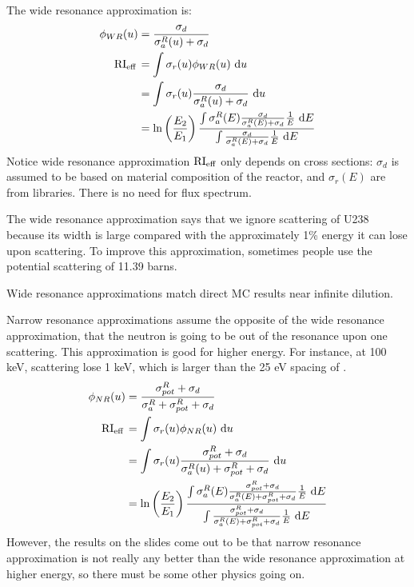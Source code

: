 \documentclass{school-22.211-notes}
\date{February 27, 2012}
\begin{document}
\maketitle

\clearpage
{}
The wide resonance approximation is: 
\begin{align}
\phi_{WR} (u) &= \frac{\sigma_d}{\sigma_{a}^R (u) +  \sigma_d } \\
\left. \mathrm{RI}_{\mathrm{eff}} \right. &= \int \sigma_r (u) \phi_{WR} (u) \mbox{ }\mathrm{d} u \\
&= \int \sigma_r(u) \frac{\sigma_d}{\sigma_a^R(u) + \sigma_d} \mbox{ }\mathrm{d} u \\
&= \ln\left( \frac{E_2}{E_1} \right) \frac{ \int \sigma_{a}^R(E) \frac{\sigma_d}{\sigma_{a}^R(E) + \sigma_d} \frac{1}{E} \mbox{ }\mathrm{d} E}{ \int \frac{\sigma_d}{\sigma_{a}^R(E) + \sigma_d} \frac{1}{E} \mbox{ }\mathrm{d} E}
\end{align}
Notice wide resonance approximation $\mathrm{RI}_{\mathrm{eff}}$ only depends on cross sections: $\sigma_d$ is assumed to be based on material composition of the reactor, and $\sigma_r(E)$ are from libraries. There is no need for flux spectrum. 

The wide resonance approximation says that we ignore scattering of U238 because its width is large compared with the approximately 1\% energy it can lose upon scattering. To improve this approximation, sometimes people use the potential scattering of 11.39 barns. 

Wide resonance approximations match direct MC results near infinite dilution. 

Narrow resonance approximations assume the opposite of the wide resonance approximation, that the neutron is going to be out of the resonance upon one scattering. This approximation is good for higher energy. For instance, at 100 keV, scattering lose 1 keV, which is larger than the 25 eV spacing of . 
\begin{align}
\phi_{NR} (u) &= \frac{\sigma_{pot}^R + \sigma_d}{\sigma_{a}^R + \sigma_{pot}^R + \sigma_d } \\
\left. \mathrm{RI}_{\mathrm{eff}} \right. &= \int \sigma_r (u) \phi_{NR} (u) \mbox{ }\mathrm{d} u \\
&= \int \sigma_r(u) \frac{\sigma_{pot}^R + \sigma_d}{\sigma_a^R(u) + \sigma_{pot}^R + \sigma_d} \mbox{ }\mathrm{d} u \\
&= \ln\left( \frac{E_2}{E_1} \right) \frac{ \int \sigma_{a}^R(E) \frac{\sigma_{pot}^R + \sigma_d}{\sigma_{a}^R(E) + \sigma_{pot}^R + \sigma_d} \frac{1}{E} \mbox{ }\mathrm{d} E}{ \int \frac{\sigma_{pot}^R + \sigma_d}{\sigma_{a}^R(E) + \sigma_{pot}^R + \sigma_d} \frac{1}{E} \mbox{ }\mathrm{d} E}
\end{align}
However, the results on the slides come out to be that narrow resonance approximation is not really any better than the wide resonance approximation at higher energy, so there must be some other physics going on. 
\end{document}
